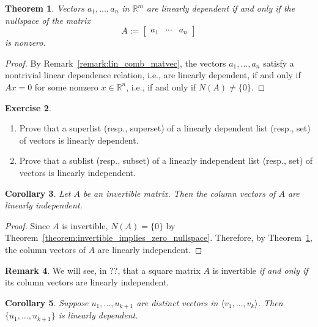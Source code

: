\documentclass{amsart}
\newcommand{\RR}{\mathbb{R}}
\newtheorem{theorem}{Theorem}[section]
\newtheorem{corollary}[theorem]{Corollary}
\theoremstyle{definition}
\newtheorem{remark}[theorem]{Remark}
\newtheorem{exercise}[theorem]{Exercise}
\begin{document}
\begin{theorem}\label{theorem:lin_ind_cols_iff_zero_nullspace}
Vectors $a_1,\ldots,a_n$ in $\RR^m$ are linearly dependent if and only if the nullspace of the matrix
\[
A:=\begin{bmatrix}a_1&\cdots&a_n\end{bmatrix}
\]
is nonzero.
\end{theorem}
\begin{proof}
By Remark~\ref{remark:lin_comb_matvec}, the vectors $a_1,\ldots, a_n$ satisfy a nontrivial linear dependence relation, i.e., are linearly dependent, if and only if $Ax=0$ for some nonzero $x\in\RR^n$, i.e., if and only if $N(A)\neq\{0\}$.
\end{proof}

\begin{exercise}\hfill
\begin{enumerate}
\item Prove that a superlist (resp., superset) of a linearly dependent list (resp., set) of vectors is linearly dependent.
\item Prove that a sublist (resp., subset) of a linearly independent list (resp., set) of vectors is linearly independent.
\end{enumerate}
\end{exercise}



\begin{corollary}\label{corollary:col_vectors_of_invertible_matrix_lin_ind}
  Let $A$ be an invertible matrix.
  Then the column vectors of $A$ are linearly independent.
\end{corollary}

\begin{proof}
  Since $A$ is invertible, $N(A)=\{0\}$ by Theorem~\ref{theorem:invertible_implies_zero_nullspace}.
  Therefore, by Theorem~\ref{theorem:lin_ind_cols_iff_zero_nullspace}, the column vectors of $A$ are linearly independent.
\end{proof}

\begin{remark}
We will see, in ??, that a square matrix $A$ is invertible \emph{if and only if} its column vectors are linearly independent.
\end{remark}

  \begin{corollary}\label{corollary:too_many_vectors}
  Suppose $u_1,\ldots,u_{k+1}$ are distinct vectors in $\langle v_1,\ldots,v_k\rangle$.
  Then $\{u_1,\ldots,u_{k+1}\}$ is linearly dependent.
  \end{corollary}
\end{document}
